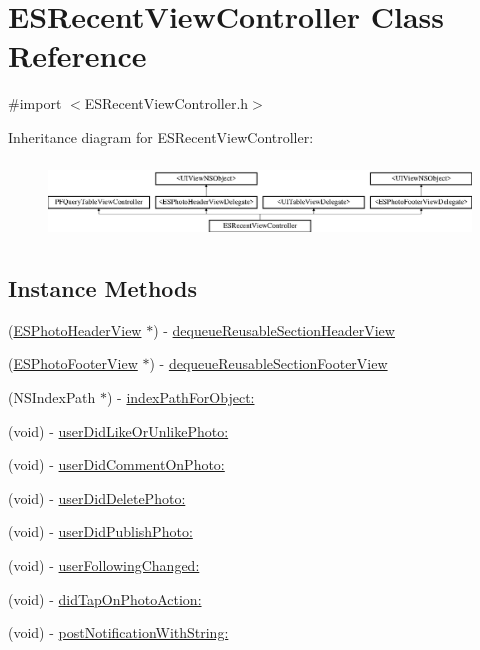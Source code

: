 \hypertarget{interface_e_s_recent_view_controller}{}\section{E\+S\+Recent\+View\+Controller Class Reference}
\label{interface_e_s_recent_view_controller}


{\ttfamily \#import $<$E\+S\+Recent\+View\+Controller.\+h$>$}

Inheritance diagram for E\+S\+Recent\+View\+Controller\+:\begin{figure}[H]
\begin{center}
\leavevmode
\includegraphics[height=2.079208cm]{interface_e_s_recent_view_controller}
\end{center}
\end{figure}
\subsection*{Instance Methods}
\begin{DoxyCompactItemize}
\item 
(\hyperlink{interface_e_s_photo_header_view}{E\+S\+Photo\+Header\+View} $\ast$) -\/ \hyperlink{interface_e_s_recent_view_controller_a62fc73d0c857b757fbdf618e556d6727}{dequeue\+Reusable\+Section\+Header\+View}
\item 
(\hyperlink{interface_e_s_photo_footer_view}{E\+S\+Photo\+Footer\+View} $\ast$) -\/ \hyperlink{interface_e_s_recent_view_controller_a75efdfa0cdaf535babf729e6e6322b0f}{dequeue\+Reusable\+Section\+Footer\+View}
\item 
(N\+S\+Index\+Path $\ast$) -\/ \hyperlink{interface_e_s_recent_view_controller_af2083e13d5ca100dfbb3ec410ecfc380}{index\+Path\+For\+Object\+:}
\item 
(void) -\/ \hyperlink{interface_e_s_recent_view_controller_aa519188119b73304f014a3b7b49cdc21}{user\+Did\+Like\+Or\+Unlike\+Photo\+:}
\item 
(void) -\/ \hyperlink{interface_e_s_recent_view_controller_ab08a3bb308874652feb1cd4e0435d5c6}{user\+Did\+Comment\+On\+Photo\+:}
\item 
(void) -\/ \hyperlink{interface_e_s_recent_view_controller_aba893ef23800cc2a582e8425b81a820a}{user\+Did\+Delete\+Photo\+:}
\item 
(void) -\/ \hyperlink{interface_e_s_recent_view_controller_ab59201718a737046a5cccd3e1f877282}{user\+Did\+Publish\+Photo\+:}
\item 
(void) -\/ \hyperlink{interface_e_s_recent_view_controller_ad34667212cc586dfaed427233b79afb0}{user\+Following\+Changed\+:}
\item 
(void) -\/ \hyperlink{interface_e_s_recent_view_controller_ab1f7a7316594d4480a76de6f641977af}{did\+Tap\+On\+Photo\+Action\+:}
\item 
(void) -\/ \hyperlink{interface_e_s_recent_view_controller_aa977105d2461b449b5ca02b6289999f9}{post\+Notification\+With\+String\+:}
\end{DoxyCompactItemize}
